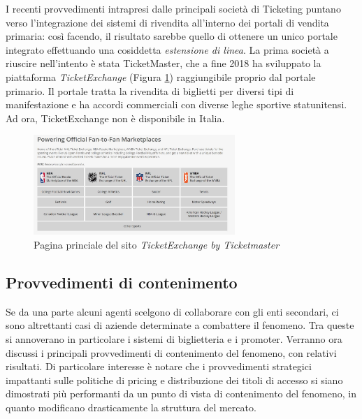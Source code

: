 I recenti provvedimenti intrapresi dalle principali società di Ticketing puntano verso l'integrazione dei sistemi di rivendita all'interno dei portali di vendita primaria: così facendo, il risultato sarebbe quello di ottenere un unico portale integrato effettuando una cosiddetta \textit{estensione di linea}. La prima società a riuscire nell'intento è stata TicketMaster, che a fine 2018 ha sviluppato la piattaforma \textit{TicketExchange} (Figura \ref{exc}) raggiungibile proprio dal portale primario. Il portale tratta la rivendita di biglietti per diversi tipi di manifestazione e ha accordi commerciali con diverse leghe sportive statunitensi. Ad ora, TicketExchange non è disponibile in Italia. 
\begin{figure}[htbp]
	\centering
	\includegraphics[width=0.68\textwidth]{chapter3/immagini/exchange}
	\caption{Pagina princiale del sito \textit{TicketExchange by Ticketmaster}}
	\label{exc}
\end{figure}
\subsection{Provvedimenti di contenimento}
Se da una parte alcuni agenti scelgono di collaborare con gli enti secondari, ci sono altrettanti casi di aziende determinate a combattere il fenomeno. Tra queste si annoverano in particolare i sistemi di biglietteria e i promoter. 
Verranno ora discussi i principali provvedimenti di contenimento del fenomeno, con relativi risultati. 
Di particolare interesse è notare che i provvedimenti strategici impattanti sulle politiche di pricing e distribuzione dei titoli di accesso si siano dimostrati più performanti da un punto di vista di contenimento del fenomeno, in quanto modificano drasticamente la struttura del mercato. 
